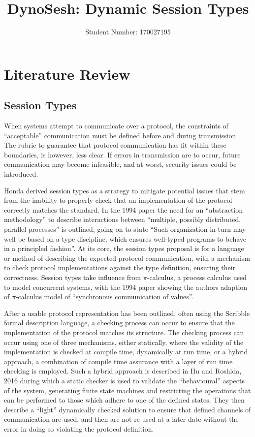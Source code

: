 \documentclass{article}
\author{Student Number: 170027195}
\title{DynoSesh: Dynamic Session Types}
\begin{document}
	\maketitle
	\pagebreak
	\tableofcontents
	\pagebreak
	\listoffigures
	\lstlistoflistings
	\pagebreak
	\section{Literature Review}
	\subsection{Session Types} \label{session types}
	When systems attempt to communicate over a protocol, the constraints of “acceptable” communication must be defined before and during transmission. The rubric to guarantee that protocol communication has fit within these boundaries, is however, less clear. If errors in transmission are to occur, future communication may become infeasible, and at worst, security issues could be introduced.
	
	Honda derived session types\cite{honda1993types, takeuchi1994interaction, honda1998language} as a strategy to mitigate potential issues that stem from the inability to properly check that an implementation of the protocol correctly matches the standard. In the 1994 paper\cite{takeuchi1994interaction} the need for an ``abstraction methodology'' to describe interactions between ``multiple, possibly distributed, parallel	processes'' is outlined, going on to state ``Such organization in turn may well be based on a type discipline, which ensures well-typed programs to behave in a principled fashion''. At its core, the session types proposal is for a language or method of describing the expected protocol communication, with a mechanism to check protocol implementations against the type definition, ensuring their correctness. 	Session types take influence from $\pi$-calculus\cite{milner1999communicating}, a process calculus used to model concurrent systems, with the 1994 paper\cite{takeuchi1994interaction} showing the authors adaption of $\pi$-calculus model of ``synchronous communication of values''.
	
	After a usable protocol representation has been outlined, often using the Scribble formal description language\cite{honda2011scribbling}, a checking process can occur to ensure that the implementation of the protocol matches its structure. The checking process can occur using one of three mechanisms, either statically, where the validity of the implementation is checked at compile time, dynamically at run time, or a hybrid approach, a combination of compile time assurance with a layer of run time checking is employed. Such a hybrid approach is described in Hu and Roshida, 2016\cite{hu2016hybrid} during which a static checker is used to validate the ``behavioural'' aspects of the system, generating finite state machines and restricting the operations that can be performed to those which adhere to one of the defined states. They then describe a ``light'' dynamically checked solution to ensure that defined channels of communication are used, and then are not re-used at a later date without the error in doing so violating the protocol definition.
	
\end{document}
